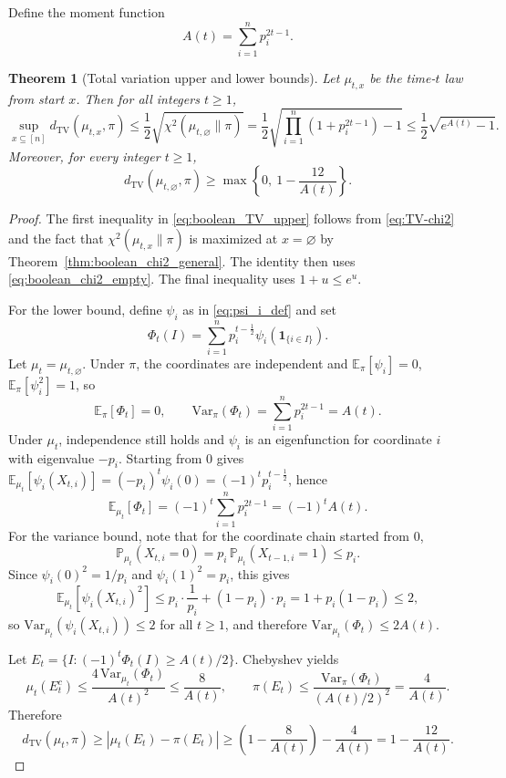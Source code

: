 \documentclass[final,3p,times]{elsarticle}
\newtheorem{theorem}{Theorem}[section]
\theoremstyle{definition}
\newcommand{\PP}{\mathbb{P}}
\newcommand{\EE}{\mathbb{E}}
\newcommand{\TV}{d_{\mathrm{TV}}}
\newcommand{\one}{\mathbf{1}}
\begin{document}
Define the moment function
\begin{equation}\label{eq:A_t_def}
A(t)=\sum_{i=1}^n p_i^{2t-1}.
\end{equation}

\begin{theorem}[Total variation upper and lower bounds]\label{thm:boolean_TV_bounds}
Let $\mu_{t,x}$ be the time-$t$ law from start $x$.
Then for all integers $t\ge 1$,
\begin{equation}\label{eq:boolean_TV_upper}
\sup_{x\subseteq[n]}\TV(\mu_{t,x},\pi)
\le
\frac12\sqrt{\chi^2(\mu_{t,\varnothing}\|\pi)}
=
\frac12\sqrt{\prod_{i=1}^n(1+p_i^{2t-1})-1}
\le
\frac12\sqrt{e^{A(t)}-1}.
\end{equation}
Moreover, for every integer $t\ge 1$,
\begin{equation}\label{eq:boolean_TV_lower}
\TV(\mu_{t,\varnothing},\pi)\ge \max\left\{0,\ 1-\frac{12}{A(t)}\right\}.
\end{equation}
\end{theorem}

\begin{proof}
The first inequality in \eqref{eq:boolean_TV_upper} follows from \eqref{eq:TV-chi2} and the fact that $\chi^2(\mu_{t,x}\|\pi)$ is maximized at $x=\varnothing$ by Theorem~\ref{thm:boolean_chi2_general}.
The identity then uses \eqref{eq:boolean_chi2_empty}.
The final inequality uses $1+u\le e^u$.

For the lower bound, define $\psi_i$ as in \eqref{eq:psi_i_def} and set
\[
\Phi_t(I)=\sum_{i=1}^n p_i^{t-\frac12}\psi_i(\one_{\{i\in I\}}).
\]
Let $\mu_t=\mu_{t,\varnothing}$.
Under $\pi$, the coordinates are independent and $\EE_\pi[\psi_i]=0$, $\EE_\pi[\psi_i^2]=1$, so
\[
\EE_\pi[\Phi_t]=0,
\qquad
\mathrm{Var}_\pi(\Phi_t)=\sum_{i=1}^n p_i^{2t-1}=A(t).
\]
Under $\mu_t$, independence still holds and $\psi_i$ is an eigenfunction for coordinate $i$ with eigenvalue $-p_i$.
Starting from $0$ gives $\EE_{\mu_t}[\psi_i(X_{t,i})]=(-p_i)^t\psi_i(0)=(-1)^t p_i^{t-\frac12}$, hence
\[
\EE_{\mu_t}[\Phi_t]=(-1)^t\sum_{i=1}^n p_i^{2t-1}=(-1)^t A(t).
\]
For the variance bound, note that for the coordinate chain started from $0$,
\[
\PP_{\mu_t}(X_{t,i}=0)=p_i\,\PP_{\mu_t}(X_{t-1,i}=1)\le p_i.
\]
Since $\psi_i(0)^2=1/p_i$ and $\psi_i(1)^2=p_i$, this gives
\[
\EE_{\mu_t}[\psi_i(X_{t,i})^2]\le p_i\cdot\frac{1}{p_i}+(1-p_i)\cdot p_i = 1+p_i(1-p_i)\le 2,
\]
so $\mathrm{Var}_{\mu_t}(\psi_i(X_{t,i}))\le 2$ for all $t\ge 1$, and therefore $\mathrm{Var}_{\mu_t}(\Phi_t)\le 2A(t)$.

Let $E_t=\{I: (-1)^t\Phi_t(I)\ge A(t)/2\}$.
Chebyshev yields
\[
\mu_t(E_t^c)\le \frac{4\,\mathrm{Var}_{\mu_t}(\Phi_t)}{A(t)^2}\le \frac{8}{A(t)},
\qquad
\pi(E_t)\le \frac{\mathrm{Var}_\pi(\Phi_t)}{(A(t)/2)^2}=\frac{4}{A(t)}.
\]
Therefore
\[
\TV(\mu_t,\pi)\ge |\mu_t(E_t)-\pi(E_t)|\ge \left(1-\frac{8}{A(t)}\right)-\frac{4}{A(t)}=1-\frac{12}{A(t)}.
\]
\end{proof}
\end{document}
